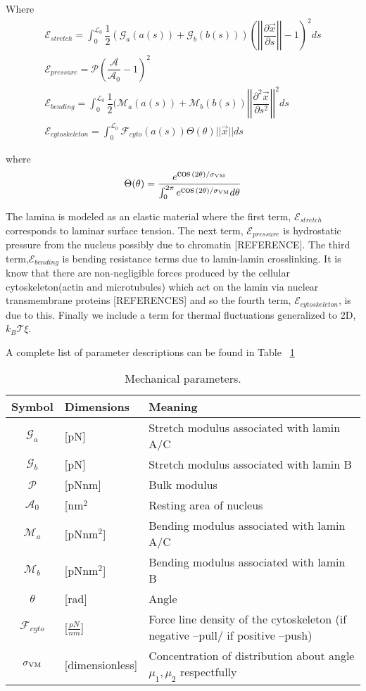 Where 
\begin{align}
\mathcal{E}_{stretch} = \displaystyle \int_0^{\mathcal{L}_0} \dfrac{1}{2} (\mathcal{G}_a(a(s)) +\mathcal{G}_b(b(s)) )\left( \left |\left| \dfrac{\partial \vec{x} }{\partial s} \right|\right| - 1\right)^2 ds \\
\mathcal{E}_{pressure}  = \mathcal{P} \left( \dfrac{\mathcal{A}}{\mathcal{A}_0} -1\right)^2  \\
\mathcal{E}_{bending} = \displaystyle\int_0^{\mathcal{L}_0} \dfrac{1}{2 } (\mathcal{M}_a(a(s)) + \mathcal{M}_b (b(s)) \left|\left| \dfrac{\partial^2 \vec{x}}{\partial s^2} \right|\right|^2 ds\\
\mathcal{E}_{cytoskeleton} = \displaystyle\int_0^{\mathcal{L}_0} \mathcal{F}_{cyto} (a(s))\Theta (\theta) || \vec{x} || ds 
\end{align}

where \[ \Theta (\theta) = \dfrac{e^{\cos(2\theta)/\sigma_{\rm VM }}}{\int_0^{ 2\pi} e^{\cos(2\theta)/\sigma_{\rm VM}}d \theta} \]


The lamina is modeled as an elastic material where the first term, $\mathcal{E}_{stretch}$ corresponds to laminar surface tension. The next term, $\mathcal{E}_{pressure}$ is hydrostatic pressure from the nucleus possibly due to chromatin [REFERENCE]. The third term,$\mathcal{E}_{bending}$  is bending resistance terms due to lamin-lamin crosslinking. It is know that there are non-negligible forces produced by the cellular cytoskeleton(actin and microtubules) which act on the lamin via nuclear transmembrane proteins [REFERENCES] and so the fourth term, $\mathcal{E}_{cytoskeleton}$, is due to this. Finally we include a term for thermal fluctuations generalized to 2D, $k_B\mathcal{T} \xi$. 

A complete list of parameter descriptions can be found in Table ~\ref{tab:nucmodelparameters}

\begin{table}[t!]
\caption{Mechanical parameters.}\centering \label{tab:nucmodelparameters} 
\begin{tabular}{ c  l  l}
\hline
Symbol & Dimensions & Meaning \\
\hline
$\mathcal{G}_a $ & [pN]  & Stretch modulus associated with lamin A/C \\
$\mathcal{G}_b$& [pN] & Stretch modulus associated with lamin B\\
$\mathcal{P}$ & [pNnm] & Bulk modulus \\
$\mathcal{A}_0$  & [nm$^2$ & Resting area of nucleus\\
$\mathcal{M}_a$ & [pNnm$^2$] &  Bending modulus associated with lamin A/C\\
$\mathcal{M}_b $ & [pNnm$^2$] &  Bending modulus associated with lamin B\\
$\theta$ &  [rad] & Angle \\
$\mathcal{F}_{cyto}$ & [$\frac{pN}{nm}$] & Force line density of the cytoskeleton (if negative --pull/ if positive --push)\\
$\sigma_{\rm VM}$ & [dimensionless] & Concentration of distribution about angle $ \mu_1, \mu_2 $ respectfully\\
\hline
\end{tabular}
\end{table}



